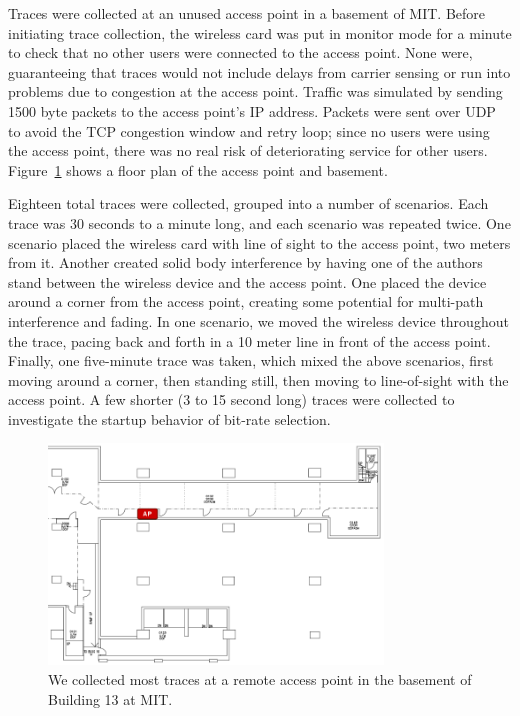 \documentclass[letterpaper,twocolumn,10pt]{article}
\begin{document}
Traces were collected at an unused access point in a basement of MIT.
Before initiating trace collection, the wireless card was put in
monitor mode for a minute to check that no other users were connected
to the access point.  None were, guaranteeing that traces would not
include delays from carrier sensing or run into problems due to
congestion at the access point.  Traffic was simulated by sending 1500
byte packets to the access point's IP address.  Packets were sent over
UDP to avoid the TCP congestion window and retry loop; since no users
were using the access point, there was no real risk of deteriorating
service for other users.  Figure~\ref{figure:1} shows a floor plan of
the access point and basement.

Eighteen total traces were collected, grouped into a number of
scenarios.  Each trace was 30 seconds to a minute long, and each
scenario was repeated twice.  One scenario placed the wireless card
with line of sight to the access point, two meters from it.  Another
created solid body interference by having one of the authors stand
between the wireless device and the access point.  One placed the
device around a corner from the access point, creating some potential
for multi-path interference and fading.  In one scenario, we moved the
wireless device throughout the trace, pacing back and forth in a 10
meter line in front of the access point.  Finally, one five-minute
trace was taken, which mixed the above scenarios, first moving around
a corner, then standing still, then moving to line-of-sight with the
access point.  A few shorter (3 to 15 second long) traces were
collected to investigate the startup behavior of bit-rate selection.

\begin{figure}[hbt]
  \centering
  \includegraphics[width=3.5in]{bsmt13floorplan.png}
  \caption{We collected most traces at a remote access point in the basement of Building 13 at MIT.}
\label{figure:1}
\end{figure}
\end{document}
